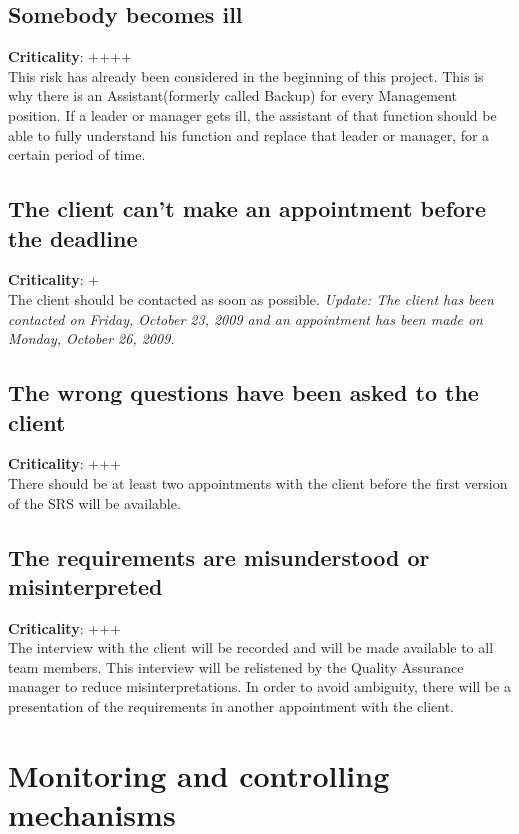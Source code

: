 \documentclass[a4paper, 12pt]{report}
\begin{document}
			\subsection{Somebody becomes ill}
			\textbf{Criticality}: ++++ \\
			This risk has already been considered in the beginning of this 
			project. This is why there is an Assistant(formerly called Backup) for 
			every Management position. If a leader or manager gets ill, the assistant 
			of that function should be able to fully understand his 
			function and replace that leader or manager, for a certain period of time.
			
			\subsection{The client can't make an appointment before the deadline}
			\textbf{Criticality}: + \\
			The client should be contacted as soon as possible. \emph{Update: The client has been
			contacted on Friday, October 23, 2009 and an appointment has been made on Monday,
			October 26, 2009.}
			
			\subsection{The wrong questions have been asked to the client}
			\textbf{Criticality}: +++ \\
			There should be at least two appointments with the client before the first version of
			the SRS will be available.
			
			\subsection{The requirements are misunderstood or misinterpreted}
			\textbf{Criticality}: +++ \\
			The interview with the client will be recorded and will be made available to all team
			members. This interview will be relistened by the Quality Assurance manager to reduce
		 	misinterpretations. In order to avoid ambiguity, there will be a presentation of the
		 	requirements in another appointment with the client.			
				
		\section{Monitoring and controlling mechanisms}	
			
\end{document}
